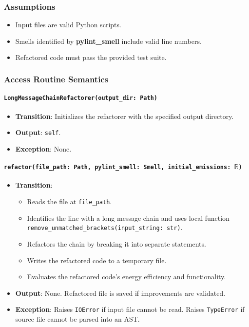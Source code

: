 \documentclass[12pt, titlepage]{article}
\begin{document}
\subsubsection{Assumptions}

\begin{itemize}
  \item Input files are valid Python scripts.
  \item Smells identified by \textbf{pylint\_smell} include valid line numbers.
  \item Refactored code must pass the provided test suite.
\end{itemize}
\subsubsection{Access Routine Semantics}

\paragraph{\texttt{LongMessageChainRefactorer(output\_dir: Path)}}
\begin{itemize}
\item \textbf{Transition}: Initializes the refactorer with the specified output directory.
\item \textbf{Output}: \texttt{self}.
\item \textbf{Exception}: None.
\end{itemize}

\paragraph{\texttt{refactor(file\_path: Path, pylint\_smell: Smell, initial\_emissions: $\mathbb{R}$)}}
\begin{itemize}
  \item \textbf{Transition}:
    \begin{itemize}
    \item Reads the file at \texttt{file\_path}.
    \item Identifies the line with a long message chain and uses local function \texttt{remove\_unmatched\_brackets(input\_string: str)}.
    \item Refactors the chain by breaking it into separate statements.
    \item Writes the refactored code to a temporary file.
    \item Evaluates the refactored code’s energy efficiency and functionality.
    \end{itemize}
  \item \textbf{Output}: None. Refactored file is saved if improvements are validated.
  \item \textbf{Exception}: Raises \texttt{IOError} if input file cannot be read. Raises \texttt{TypeError} if source file cannot be parsed into an AST.
\end{itemize}
\end{document}
